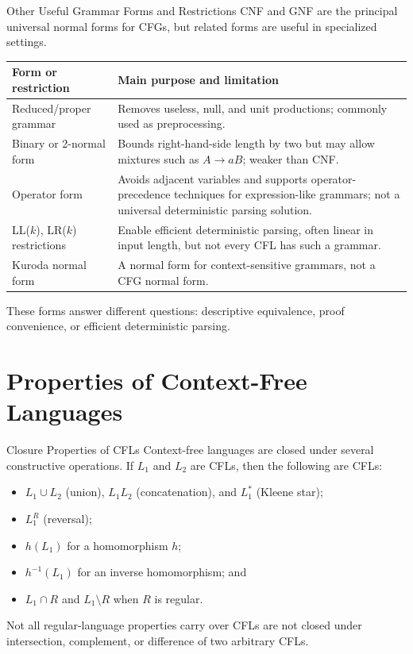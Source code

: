 \documentclass[10pt]{beamer}
\begin{document}
\begin{frame}{Other Useful Grammar Forms and Restrictions}
  \small
  CNF and GNF are the principal universal normal forms for CFGs, but related
  forms are useful in specialized settings.
  \begin{center}
  \begin{tabular}{L{3.2cm}L{7.1cm}}
    \toprule
    Form or restriction & Main purpose and limitation \\
    \midrule
    Reduced/proper grammar & Removes useless, null, and unit productions;
      commonly used as preprocessing. \\
    Binary or 2-normal form & Bounds right-hand-side length by two but may
      allow mixtures such as $A\to aB$; weaker than CNF. \\
    Operator form & Avoids adjacent variables and supports
      operator-precedence techniques for expression-like grammars; not a
      universal deterministic parsing solution. \\
    LL($k$), LR($k$) restrictions & Enable efficient deterministic parsing,
      often linear in input length, but not every CFL has such a grammar. \\
    Kuroda normal form & A normal form for context-sensitive grammars, not a
      CFG normal form. \\
    \bottomrule
  \end{tabular}
  \end{center}
  These forms answer different questions: descriptive equivalence, proof
  convenience, or efficient deterministic parsing.
\end{frame}

\section{Properties of Context-Free Languages}

\begin{frame}{Closure Properties of CFLs}
  \small
  Context-free languages are closed under several constructive operations.
  If $L_1$ and $L_2$ are CFLs, then the following are CFLs:
  \begin{itemize}
    \item $L_1\cup L_2$ (union), $L_1L_2$ (concatenation), and $L_1^*$ (Kleene star);
    \item $L_1^R$ (reversal);
    \item $h(L_1)$ for a homomorphism $h$;
    \item $h^{-1}(L_1)$ for an inverse homomorphism; and
    \item $L_1\cap R$ and $L_1\setminus R$ when $R$ is regular.
  \end{itemize}
  \pause
  \begin{alertblock}{Not all regular-language properties carry over}
    CFLs are not closed under intersection, complement, or difference of two arbitrary CFLs.
  \end{alertblock}
\end{frame}
\end{document}
